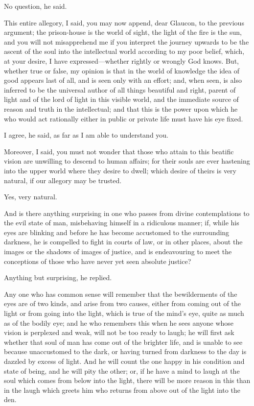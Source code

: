 No question, he said.

This entire allegory, I said, you may now append, dear Glaucon, to the
previous argument; the prison-house is the world of sight, the light
of the fire is the sun, and you will not misapprehend me if you
interpret the journey upwards to be the ascent of the soul into the
intellectual world according to my poor belief, which, at your desire,
I have ex\-pressed---whether rightly or wrongly God knows. But,
whether true or false, my opinion is that in the world of knowledge
the idea of good appears last of all, and is seen only with an effort;
and, when seen, is also inferred to be the universal author of all
things beautiful and right, parent of light and of the lord of light
in this visible world, and the immediate source of reason and truth in
the intellectual; and that this is the power upon which he who would
act rationally either in public or private life must have his eye
fixed.

I agree, he said, as far as I am able to understand you.

Moreover, I said, you must not wonder that those who attain to this
beatific vision are unwilling to descend to human affairs; for their
souls are ever hastening into the upper world where they desire to
dwell; which desire of theirs is very natural, if our allegory may be
trusted.

Yes, very natural.

And is there anything surprising in one who passes from divine
contemplations to the evil state of man, misbehaving himself in a
ridiculous manner; if, while his eyes are blinking and before he has
become accustomed to the surrounding darkness, he is compelled to
fight in courts of law, or in other places, about the images or the
shadows of images of justice, and is endeavouring to meet the
conceptions of those who have never yet seen absolute justice?

Anything but surprising, he replied.

Any one who has common sense will remember that the bewilderments of
the eyes are of two kinds, and arise from two causes, either from
coming out of the light or from going into the light, which is true of
the mind's eye, quite as much as of the bodily eye; and he who
remembers this when he sees anyone whose vision is perplexed and weak,
will not be too ready to laugh; he will first ask whether that soul of
man has come out of the brighter life, and is unable to see because
unaccustomed to the dark, or having turned from darkness to the day is
dazzled by excess of light. And he will count the one happy in his
condition and state of being, and he will pity the other; or, if he
have a mind to laugh at the soul which comes from below into the
light, there will be more reason in this than in the laugh which
greets him who returns from above out of the light into the den.

